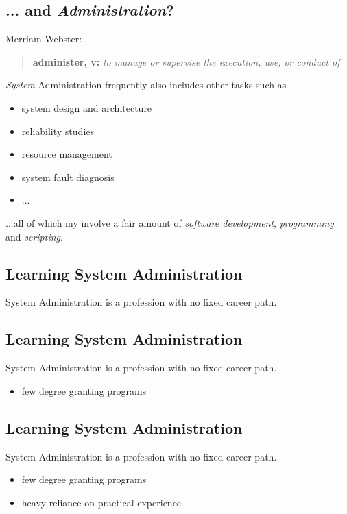 \documentclass[xga]{xdvislides}
\begin{document}
\subsection{... and {\em Administration}?}
Merriam Webster:
\begin{quote}
	{\bf administer, v:} {\em to manage or supervise the execution, use, or conduct of} \\
\end{quote}

{\em System} Administration frequently also includes other tasks such as
\begin{itemize}
	\item system design and architecture
	\item reliability studies
	\item resource management
	\item system fault diagnosis
	\item ...
\end{itemize}
\vspace{.5in}

...all of which my involve a fair amount of {\em software development}, {\em
programming} and {\em scripting}.

\subsection{Learning System Administration}
System Administration is a profession with no fixed career path.

\subsection{Learning System Administration}
System Administration is a profession with no fixed career path.

\begin{itemize}
	\item few degree granting programs
\end{itemize}

\subsection{Learning System Administration}
System Administration is a profession with no fixed career path.

\begin{itemize}
	\item few degree granting programs
	\item heavy reliance on practical experience
\end{itemize}
\end{document}
